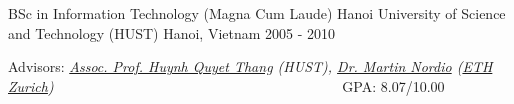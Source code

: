 \begin{cventries}
  \cventry
  { BSc in Information Technology (Magna Cum Laude)} %
  {Hanoi University of Science and Technology (HUST)} %
  {Hanoi, Vietnam} %
  {2005 - 2010} %
  {
  	\begin{cvitems} %
	  	\item Advisors: {\em \href{http://www.soict.hut.edu.vn/~thanghq/}{Assoc. Prof. Huynh Quyet Thang}  (HUST), \href{http://se.inf.ethz.ch/people/nordio/}{Dr. Martin Nordio} (\href {http://se.inf.ethz.ch/}{ETH Zurich}) ~~~~~~~~~~~~~~~~~~~~~~~~~~~~~~~~~~~~~~~} GPA: 8.07/10.00 
  	\end{cvitems}
  }  

\end{cventries}




